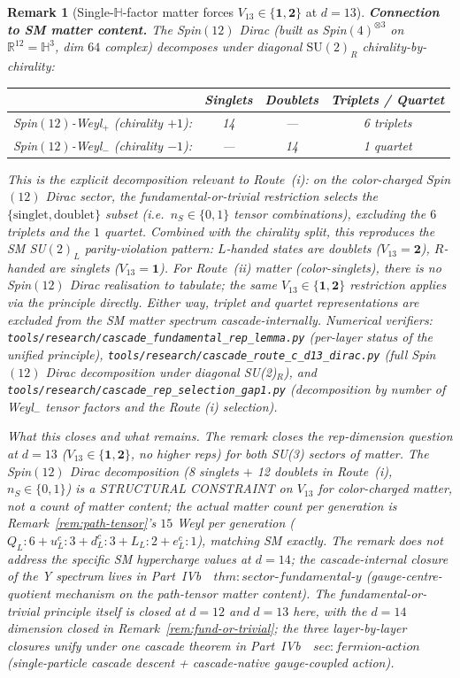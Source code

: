 \documentclass[12pt,a4paper]{article}
\newtheorem{remark}[theorem]{Remark}
\begin{document}
\begin{remark}[Single-$\mathbb{H}$-factor matter forces $V_{13}\in\{\mathbf{1},\mathbf{2}\}$ at $d=13$]
\medskip\noindent\textbf{Connection to SM matter content.}
The Spin$(12)$ Dirac (built as Spin$(4)^{\otimes 3}$ on
$\mathbb{R}^{12}=\mathbb{H}^3$, dim $64$ complex) decomposes under
diagonal $\mathrm{SU}(2)_R$ chirality-by-chirality:
\begin{center}
\begin{tabular}{cccc}
\toprule
& Singlets & Doublets & Triplets / Quartet \\
\midrule
Spin$(12)$-Weyl$_+$ (chirality $+1$): & 14 & --- & 6 triplets \\
Spin$(12)$-Weyl$_-$ (chirality $-1$): & --- & 14 & 1 quartet \\
\bottomrule
\end{tabular}
\end{center}
This is the explicit decomposition relevant to Route~(i): on the
color-charged Spin$(12)$ Dirac sector, the
fundamental-or-trivial restriction selects the
$\{\text{singlet},\text{doublet}\}$ subset (i.e.\ $n_S\in\{0,1\}$
tensor combinations), excluding the $6$ triplets and the $1$ quartet.
Combined with the chirality split, this reproduces the SM
SU$(2)_L$ parity-violation pattern: $L$-handed states are doublets
($V_{13}=\mathbf{2}$), $R$-handed are singlets ($V_{13}=\mathbf{1}$).
For Route~(ii) matter (color-singlets), there is no Spin$(12)$
Dirac realisation to tabulate; the same $V_{13}\in\{\mathbf{1},
\mathbf{2}\}$ restriction applies via the principle directly. Either
way, triplet and quartet representations are excluded from the SM
matter spectrum cascade-internally. Numerical verifiers:
\texttt{tools/research/cascade\_fundamental\_rep\_lemma.py}
(per-layer status of the unified principle),
\texttt{tools/research/cascade\_route\_c\_d13\_dirac.py} (full Spin$(12)$
Dirac decomposition under diagonal SU(2)$_R$), and
\texttt{tools/research/cascade\_rep\_selection\_gap1.py} (decomposition
by number of Weyl$_-$ tensor factors and the Route (i) selection).

\medskip\noindent\emph{What this closes and what remains.}
The remark closes the rep-dimension question at $d=13$
($V_{13}\in\{\mathbf{1},\mathbf{2}\}$, no higher reps) for both SU(3)
sectors of matter. The Spin$(12)$ Dirac decomposition (8 singlets
$+$ 12 doublets in Route~(i), $n_S\in\{0,1\}$) is a STRUCTURAL
CONSTRAINT on $V_{13}$ for color-charged matter, not a count of
matter content; the actual matter count per generation is
Remark~\ref{rem:path-tensor}'s $15$ Weyl per generation
($Q_L: 6 + u_L^c: 3 + d_L^c: 3 + L_L: 2 + e_L^c: 1$), matching
SM exactly. The remark does not address the specific SM
hypercharge values at $d=14$; the cascade-internal closure of
the Y spectrum lives in
Part~IVb~\cite{part4b}~$\mathit{thm{:}sector\text{-}fundamental\text{-}y}$
(gauge-centre-quotient mechanism on the path-tensor matter
content). The fundamental-or-trivial principle itself is closed
at $d=12$ and $d=13$ here, with the $d=14$ dimension closed in
Remark~\ref{rem:fund-or-trivial}; the three layer-by-layer
closures unify under one cascade theorem in
Part~IVb~\cite{part4b}~$\mathit{sec{:}fermion\text{-}action}$
(single-particle cascade descent + cascade-native gauge-coupled
action).
\end{remark}
\end{document}
